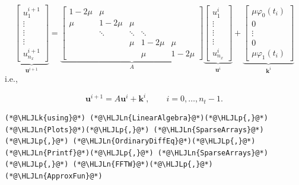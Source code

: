 \documentclass[12pt,a4paper]{article}
\newcommand{\HLJLk}[1]{\textcolor[RGB]{148,91,176}{\textbf{#1}}}
\newcommand{\HLJLn}[1]{#1}
\newcommand{\HLJLp}[1]{#1}
\begin{document}
\[
\underbrace{\begin{bmatrix}
u^{i+1}_{1} \\
\vdots \\
\vdots \\
\vdots \\
u^{i+1}_{n_x}
\end{bmatrix}}_{\mathbf{u}^{i+1}} = 
\underbrace{\begin{bmatrix}
1 - 2\mu & \mu & & & \\
\mu  & 1-2\mu & \mu  & & \\
      & \ddots & \ddots & \ddots & \\
      &        & \mu    & 1- 2\mu & \mu \\
      &        &        &\mu      & 1-2\mu
\end{bmatrix}}_{A}
\underbrace{\begin{bmatrix}
u^{i}_{1} \\
\vdots \\
\vdots \\
\vdots \\
u^{i}_{n_x}
\end{bmatrix}}_{\mathbf{u}^i}
+
\underbrace{\begin{bmatrix}
\mu\varphi_0(t_i) \\
0 \\
\vdots \\
0 \\
\mu \varphi_1(t_i)
\end{bmatrix}}_{\mathbf{k}^i}
\]
i.e., 

\[
\mathbf{u}^{i+1} = A\mathbf{u}^i + \mathbf{k}^i, \qquad i = 0, \ldots, n_t-1.
\]

\begin{lstlisting}
(*@\HLJLk{using}@*) (*@\HLJLn{LinearAlgebra}@*)(*@\HLJLp{,}@*) (*@\HLJLn{Plots}@*)(*@\HLJLp{,}@*) (*@\HLJLn{SparseArrays}@*)(*@\HLJLp{,}@*) (*@\HLJLn{OrdinaryDiffEq}@*)(*@\HLJLp{,}@*) (*@\HLJLn{Printf}@*)(*@\HLJLp{,}@*) (*@\HLJLn{SparseArrays}@*)(*@\HLJLp{,}@*) (*@\HLJLn{FFTW}@*)(*@\HLJLp{,}@*) (*@\HLJLn{ApproxFun}@*)
\end{lstlisting}
\end{document}
